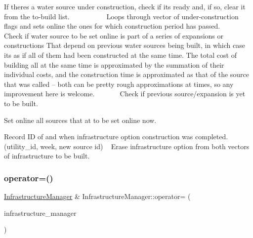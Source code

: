 If there\textquotesingle{}s a water source under construction, check if it\textquotesingle{}s ready and, if so, clear it from the to-\/build list. ~\newline
~\newline
~\newline
~\newline
~\newline
~\newline
 Loops through vector of under-\/construction flags and sets online the ones for which construction period has passed. ~\newline
~\newline
~\newline
~\newline
~\newline
 Check if water source to be set online is part of a series of expansions or constructions That depend on previous water sources being built, in which case it\textquotesingle{}s as if all of them had been constructed at the same time. The total cost of building all at the same time is approximated by the summation of their individual costs, and the construction time is approximated as that of the source that was called -- both can be pretty rough approximations at times, so any improvement here is welcome. ~\newline
~\newline
~\newline
~\newline
 Check if previous source/expansion is yet to be built.

Set online all sources that at to be set online now.

Record ID of and when infrastructure option construction was completed. (utility\+\_\+id, week, new source id) ~\newline
 Erase infrastructure option from both vectors of infrastructure to be built. \mbox{\label{classInfrastructureManager_a30910bd8edf01ae2899561b49d7719c1}} 
\subsubsection{\texorpdfstring{operator=()}{operator=()}}
{\footnotesize\ttfamily \mbox{\hyperlink{classInfrastructureManager}{Infrastructure\+Manager}} \& Infrastructure\+Manager\+::operator= (\begin{DoxyParamCaption}\item[{const \mbox{\hyperlink{classInfrastructureManager}{Infrastructure\+Manager}} \&}]{infrastructure\+\_\+manager }\end{DoxyParamCaption})}

